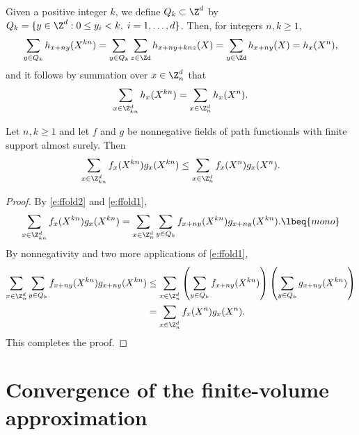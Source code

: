 Given a positive integer $k$, we define
$Q_k \subset \Z^d$ by $Q_k = \{y \in \Z^d : 0 \le y_i < k, \;   i=1,\ldots,d\}$.
Then, for integers $n,k \ge 1$,
\begin{equation}
\label{e:ffold1}
    \sum_{y \in Q_k} h_{x+ny}(X^{kn})
  = \sum_{y \in Q_k} \sum_{z\in\Zd} h_{x+ny+knz}(X)
  = \sum_{y\in\Zd} h_{x+ny}(X)
  = h_x(X^n),
\end{equation}
and it follows by summation over $x \in \Z^d_n$ that
\begin{equation}
\label{e:ffold2}
\sum_{x\in\Z^d_{kn}} h_x(X^{kn})
  =
\sum_{x\in\Z^d_n} h_x(X^n).
\end{equation}

\begin{lemma}
\label{lem:mono}
Let $n,k \ge 1$ and let $f$ and $g$ be nonnegative fields of path functionals
with finite support almost surely.
Then
\begin{equation}
\sum_{x\in\Z^d_{kn}} f_x(X^{kn}) g_x(X^{kn})
  \leq
\sum_{x\in\Z^d_n} f_x(X^n) g_x(X^n).
\end{equation}
\end{lemma}

\begin{proof}
By \eqref{e:ffold2} and \eqref{e:ffold1},
\begin{equation}
\sum_{x\in\Z_{kn}^d} f_x(X^{kn}) g_x(X^{kn})
  =
\sum_{x\in\Z_n^d}
\sum_{y \in Q_k}
  f_{x+ny}(X^{kn}) g_{x+ny}(X^{kn}).
\lbeq{mono}
\end{equation}
By nonnegativity and two more applications of \eqref{e:ffold1},
\begin{align}
\sum_{x\in\Z_n^d}
\sum_{y \in Q_k}
f_{x+ny}(X^{kn}) g_{x+ny}(X^{kn})
  &\le \sum_{x\in\Z_n^d}
      \left(\sum_{y \in Q_k} f_{x+ny}(X^{kn})\right)
      \left(\sum_{y \in Q_k} g_{x+ny}(X^{kn})\right) \nonumber \\
  &= \sum_{x\in\Z_n^d} f_x(X^n) g_x(X^n).
\end{align}
This completes the proof.
\end{proof}


\section{Convergence of the finite-volume approximation}

